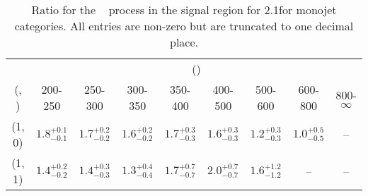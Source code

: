 \begin{table}[h!]
\tiny
\centering
\caption{Ratio for the \zInv~ process in the signal region for 2.1\ifb for monojet categories. All entries are non-zero but are truncated to one decimal place.\label{tab:ratiosep_sig_zinv_mono}}
\begin{tabular}
{ccccccccc}
	\hline\hline
	& \multicolumn{8}{c}{\scalht (\gev)} \\ 
	 (\njet,  \nb) & 200-250 & 250-300 & 300-350 & 350-400 & 400-500 & 500-600 & 600-800 & 800-$\infty$ \\ [0.8ex] 
\hline
	(1, 0) & $1.8^{+ 0.1 }_{- 0.1 }$ & $1.7^{+ 0.2 }_{- 0.2 }$ & $1.6^{+ 0.2 }_{- 0.2 }$ & $1.7^{+ 0.3 }_{- 0.3 }$ & $1.6^{+ 0.3 }_{- 0.3 }$ & $1.2^{+ 0.3 }_{- 0.3 }$ & $1.0^{+ 0.5 }_{- 0.5 }$ & -- \\[0.5ex] 
	(1, 1) & $1.4^{+ 0.2 }_{- 0.2 }$ & $1.4^{+ 0.3 }_{- 0.3 }$ & $1.3^{+ 0.4 }_{- 0.4 }$ & $1.7^{+ 0.7 }_{- 0.7 }$ & $2.0^{+ 0.7 }_{- 0.7 }$ & $1.6^{+ 1.2 }_{- 1.2 }$ & -- & -- \\[0.5ex] 
	\hline
	\hline
\end{tabular}
\end{table}
